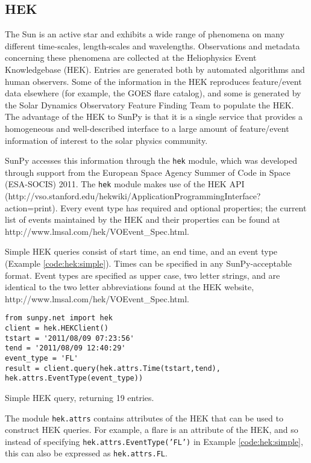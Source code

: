 \subsection{HEK}\label{ssec:hek}

The Sun is an active star and exhibits a wide range of phenomena on
many different time-scales, length-scales and wavelengths.
Observations and metadata concerning these phenomena are collected at
the Heliophysics Event Knowledgebase (HEK).  Entries are generated
both by automated algorithms and human observers.  Some of the
information in the HEK reproduces feature/event data elsewhere (for
example, the GOES flare catalog), and some is generated by the Solar
Dynamics Observatory Feature Finding Team \cite{SDOFFT paper???} to
populate the HEK.  The advantage of the HEK to SunPy is that it is a
single service that provides a homogeneous and well-described
interface to a large amount of feature/event information of interest
to the solar physics community.

SunPy accesses this information through the \texttt{hek} module, which
was developed through support from the European Space Agency Summer of
Code in Space (ESA-SOCIS) 2011.  The \texttt{hek} module makes use of
the HEK API
(http://vso.stanford.edu/hekwiki/ApplicationProgrammingInterface?action=print).
Every event type has required and optional properties; the current
list of events maintained by the HEK and their properties can be found
at http://www.lmsal.com/hek/VOEvent_Spec.html.

Simple HEK queries consist of start time, an end time, and an event
type (Example \ref{code:hek:simple}). Times can be specified in any
SunPy-acceptable format. Event types are specified as upper case, two
letter strings, and are identical to the two letter abbreviations
found at the HEK website, http://www.lmsal.com/hek/VOEvent_Spec.html.

\begin{listing}
\begin{verbatim}
from sunpy.net import hek
client = hek.HEKClient()
tstart = '2011/08/09 07:23:56'
tend = '2011/08/09 12:40:29'
event_type = 'FL'
result = client.query(hek.attrs.Time(tstart,tend), hek.attrs.EventType(event_type))
\end{verbatim}
\caption{Simple HEK query, returning 19 entries.}
\label{code:hek:simple}
\end{listing}

The module \texttt{hek.attrs} contains attributes of the HEK that can be used to
construct HEK queries.  For example, a flare is an attribute of the
HEK, and so instead of specifying \texttt{hek.attrs.EventType('FL')}
in Example \ref{code:hek:simple}, this can also be expressed as
\texttt{hek.attrs.FL}. 

